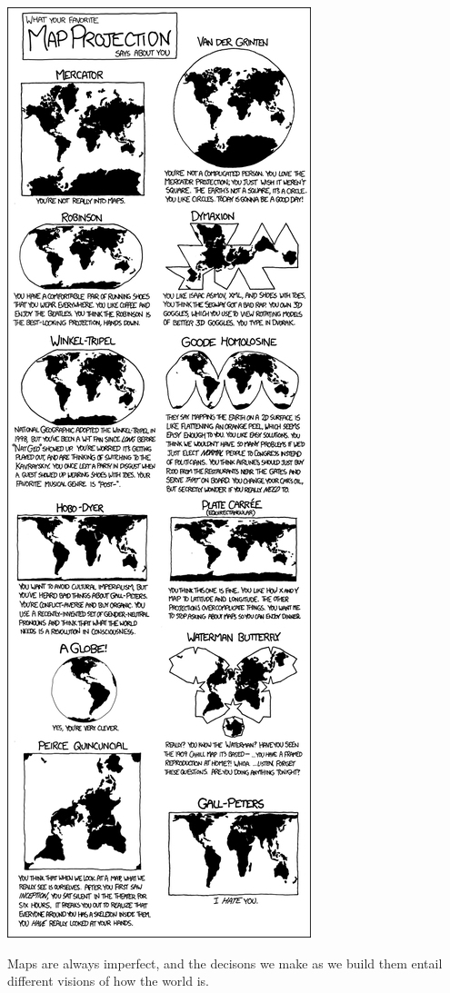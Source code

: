 \documentclass[]{article}
\begin{document}
\includegraphics{media/map_projections.png}

Maps are always imperfect, and the decisons we make as we build them entail
different visions of how the world is.
\end{document}
